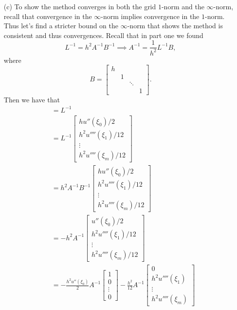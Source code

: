 \documentclass[12pt]{report}
\begin{document}
\begin{solution}
\begin{enumerate}
    \item [(c)]
    To show the method converges in both the grid $1$-norm and the $\infty$-norm, recall that convergence in the $\infty$-norm implies convergence in the $1$-norm. Thus let's find a stricter bound on the $\infty$-norm that shows the method is consistent and thus convergences. Recall that in part one we found
    \[ 
      L^{-1} = h^2 A^{-1}B^{-1} \implies A^{-1} = \frac{1}{h^2}L^{-1}B,
    \]
    where
    \[ 
      B = \begin{bmatrix}
        h\\ &1\\ &&\ddots\\ &&&1
      \end{bmatrix}.
    \]
    Then we have that
    \begin{align*}
      [E_j] &= L^{-1}\\
      &=  L^{-1}\begin{bmatrix}
        h u''(\xi_0)/2\\
        h^2 u''''(\xi_1)/12\\
        \vdots\\
        h^2 u''''(\xi_m)/12
      \end{bmatrix}\\
      &= h^2 A^{-1}B^{-1} \begin{bmatrix}
        h u''(\xi_0)/2\\
        h^2 u''''(\xi_1)/12\\
        \vdots\\
        h^2 u''''(\xi_m)/12
      \end{bmatrix}\\
      &= - h^2A^{-1} \begin{bmatrix}
        u''(\xi_0)/2\\
        h^2 u''''(\xi_1)/12\\
        \vdots\\
        h^2 u''''(\xi_m)/12
      \end{bmatrix}\\
      &= - \frac{h^2 u''(\xi_0)}{2}A^{-1}\begin{bmatrix}
        1\\ 0 \\ \vdots \\ 0
      \end{bmatrix} - \frac{h^2}{12}A^{-1}\begin{bmatrix}
        0\\ h^2 u''''(\xi_1) \\ \vdots\\ h^2 u''''(\xi_m)

\end{bmatrix}
\end{align*}
\end{enumerate}
\end{solution}
\end{document}
